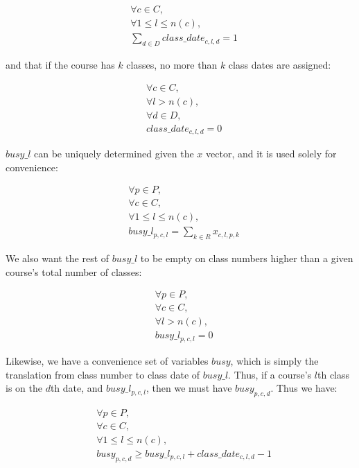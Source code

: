 \begin{align} \label{eq:oneclassdate}
  &\forall c \in C,\\
  &\forall 1 \le l \le n(c),\\
  &\sum_{d \in D} class\_date_{c, l, d} = 1
\end{align}

and that if the course has $k$ classes, no more than $k$ class dates are assigned:

\begin{align} \label{eq:maxclassdates}
  &\forall c \in C,\\
  &\forall l > n(c),\\
  &\forall d \in D,\\
  &class\_date_{c, l, d} = 0
\end{align}

$busy\_l$ can be uniquely determined given the $x$ vector, and it is used solely for convenience:

\begin{align}
  &\forall p \in P,\\
  &\forall c \in C,\\
  &\forall 1\le l \le n(c),\\
  &busy\_l_{p, c, l} = \sum_{k \in R} x_{c, l, p, k}
\end{align}

We also want the rest of $busy\_l$ to be empty on class numbers higher than a given course's total number of classes:

\begin{align}
  &\forall p \in P,\\
  &\forall c \in C,\\
  &\forall l > n(c),\\
  &busy\_l_{p, c, l} = 0
\end{align}

Likewise, we have a convenience set of variables $busy$, which is simply the translation from class number to class date of $busy\_l$. Thus, if a course's $l$th class is on the $d$th date, and $busy\_l_{p, c, l}$, then we must have $busy_{p, c, d}$. Thus we have:

\begin{align}
  &\forall p \in P,\\
  &\forall c \in C,\\
  &\forall 1 \le l \le n(c),\\
  &busy_{p, c, d} \ge busy\_l_{p, c, l} + class\_date_{c, l, d} - 1
\end{align}

